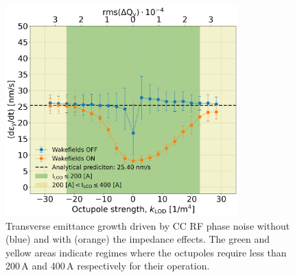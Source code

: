\begin{figure}[!h] %
   \centering         
   \includegraphics[width=0.8\textwidth]{images/Ch8/deyRates_sps_270GeV_PN1e-8_400MHz_SPS_CC2_updatedWakes_y-plane_WakesOFF_vs_WakesON_new_QpxQpy0.5_6D_Nb5e5_intensity3e10Scan_vs_TuneSpreadvsExpectedSPS_octupole_current.png}
       \caption{Transverse emittance growth driven by CC RF phase noise without (blue) and with (orange) the impedance effects. The green and yellow areas indicate regimes where the octupoles require less than 200\,A and 400\,A respectively for their operation.}
       \label{fig:pyheadtail_cc_impedance_2022_md_octupole_current}
\end{figure}

